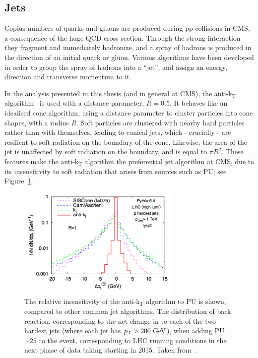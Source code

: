 \subsection{Jets}
Copius numbers of quarks and gluons are produced during pp collisions in \ac{CMS}, a consequence of the huge \ac{QCD} cross section.
Through the strong interaction they fragment and immediately hadronize, and a spray of hadrons is produced in the direction of an initial quark or gluon.
Various algorithms have been developed in order to group the spray of hadrons into a ``jet'', and assign an energy, direction and transverse momentum to it.

In the analysis presented in this thesis (and in general at \ac{CMS}), the anti-k$_{\mathrm{T}}$ algorithm~\cite{bib:akjets} is used with a distance parameter, $R = 0.5$.
It behaves like an idealised cone algorithm, using a distance parameter to cluster particles into cone shapes, with a radius $R$. Soft particles are clustered with nearby hard particles rather than with themselves, leading to conical jets, which - crucially - are resilient to soft radiation on the boundary of the cone.
Likewise, the area of the jet is unaffected by soft radiation on the boundary, and is equal to $\pi R^{2}$. 
These features make the anti-k$_{\mathrm{T}}$ algorithm the preferential jet algorithm at \ac{CMS}, due to its insensitivity to soft radiation that arises from sources such as \ac{PU}; see Figure~\ref{fig:antikT_PU}. 

\begin{figure}[htbp]
  \begin{center}
  \includegraphics[width=0.7\textwidth]{Figures/detector/PUantiKT}
  \caption{The relative insensitivity of the anti-k$_{\mathrm{T}}$ algorithm to \ac{PU} is shown, compared to other common jet algorithms. The distribution of back reaction, corresponding to the net change in \pt to each of the two hardest jets (where each jet has $p_{\text{T}}>200~\mathrm{GeV}$), when adding \ac{PU}$\sim 25$ to the event, corresponding to \ac{LHC} running conditions in the next phase of data taking starting in 2015. Taken from~\cite{bib:akjets}.}
  \label{fig:antikT_PU}
  \end{center}
\end{figure}


